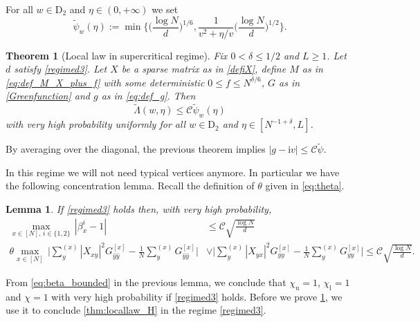 \documentclass[11pt]{article}
\newcommand{\ii}{\mathrm{i}}
\theoremstyle{plain}
\newtheorem{thm}[thhm]{Theorem}
\newtheorem{lemma}{Lemma}[section]
\theoremstyle{remark}
\numberwithin{equation}{section}
\newcommand*\bset[1]{[#1]}
\newcommand*\ubarr[1]{{\widehat{#1}}}
\begin{document}
	For all $w\in \mathrm{D}_2$ and $\eta \in (0, +\infty)$ we set
	\begin{equation*}
		\widetilde{\psi}_w(\eta) := \min \biggl\{ \biggl(\frac{\log N}{d} \biggr)^{1/6} , \frac{1}{v^2 + \eta/v} \biggl(\frac{\log N}{d}\biggr)^{1/2} \biggr\}.
	\end{equation*}
	
	
	
	\begin{thm}[Local law in supercritical regime]\label{thm:locallaw3}
		Fix $ 0 < \delta \le 1/2$ and $L \ge 1$. Let $d$ satisfy \eqref{regimed3}. Let $X$ be a sparse matrix as in \cref{defiX}, define $M$ as in \eqref{eq:def_M_X_plus_f} with some deterministic $0 \le f \le N^{\delta/6}$, $G$ as in \eqref{Greenfunction} and $g$ as in \eqref{eq:def_g}. 
		Then  
		\begin{equation*}
			\widetilde{\Lambda}(w,\eta) \le \mathcal C \widetilde{\psi}_w(\eta)
		\end{equation*}
		with very high probability uniformly for all $w \in \mathrm{D}_2$ and $\eta \in [N^{-1 + \delta}, L]$.
	\end{thm}
	
	By averaging over the diagonal, the previous theorem implies 
	$ |g- \ii v | \leq \mathcal C \widetilde{\psi}$.
	
	
	
	In this regime we will not need typical vertices anymore. In particular we have the following concentration lemma. Recall the definition of $\theta$ given in \eqref{eq:theta}.
	\begin{lemma}\label{lem:sumXabGa_eq_sumGa}
		If \eqref{regimed3} holds then,  
		with very high probability,
		\begin{align}
			\label{eq:beta_bounded}
			\max_{x \in [N],\, i \in \{1,2\}}\, |\beta_{x}^i -1| & \le \mathcal C  \sqrt{\frac{\log N}{d} } \\ 
			\label{eq:all_vert_typi}
			\theta\max_{x \in [N]} \, \biggl|\sum_{y}^{(x)} |X_{xy}|^2G_{\ubarr{y}\ubarr{y}}^{\bset{x}} - \frac{1}{N}\sum_{y}^{(x)} G_{\ubarr{y}\ubarr{y}}^{\bset{x}}\biggr| 
			& \vee
			\biggl|\sum_{y}^{(x)}  |X_{yx}|^2G_{yy}^{\bset{x}} - \frac{1}{N} \sum_{y}^{(x)}  G_{yy}^{\bset{x}}\biggr| \le \mathcal{C}  \sqrt{\frac{\log N}{d} }.
		\end{align}
	\end{lemma}
	From \eqref{eq:beta_bounded} in the previous lemma, we conclude that $\chi_{\mathrm u} = 1$, $\chi_\mathrm{l} = 1$ and $\chi = 1$ with very high probability if \eqref{regimed3} holds.
	Before we prove \cref{lem:sumXabGa_eq_sumGa}, we use it to conclude 
	\cref{thm:locallaw_H} in the regime \eqref{regimed3}. 
	
\end{document}
